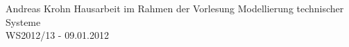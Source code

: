 
\date{\today}


{Andreas Krohn} %
{Hausarbeit im Rahmen der Vorlesung Modellierung technischer Systeme\\
WS2012/13 - 09.01.2012} %

% 

\tableofcontents %










